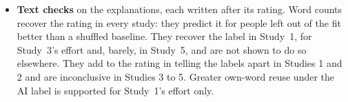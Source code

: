 \begin{itemize}
\item \textbf{Text checks} on the explanations, each written after its rating. Word counts recover the rating in every study: they predict it for people left out of the fit better than a shuffled baseline. They recover the label in Study~1, for Study~3's effort and, barely, in Study~5, and are not shown to do so elsewhere. They add to the rating in telling the labels apart in Studies 1 and 2 and are inconclusive in Studies 3 to 5. Greater own-word reuse under the AI label is supported for Study~1's effort only.
\end{itemize}
\endgroup
